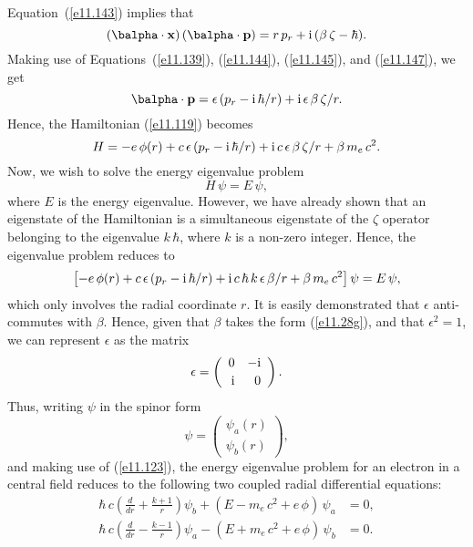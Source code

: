 Equation~(\ref{e11.143}) implies that
\begin{equation}
(\balpha\cdot{\bf x})\,(\balpha\cdot{\bf p}) = r\,p_r+{\rm i}\,(\beta\,\zeta-\hbar).
\end{equation}
Making use of Equations~(\ref{e11.139}), (\ref{e11.144}), (\ref{e11.145}), and (\ref{e11.147}), we get
\begin{equation}
\balpha\cdot {\bf p} = \epsilon\,(p_r-{\rm i}\,\hbar/r) + {\rm i}\,\epsilon\,\beta\,\zeta/r.
\end{equation}
Hence, the Hamiltonian (\ref{e11.119}) becomes
\begin{equation}
H= - e\,\phi(r) + c\,\epsilon\,(p_r-{\rm i}\,\hbar/r) + {\rm i}\,c\,\epsilon\,\beta\,\zeta/r + \beta\,m_e\,c^2.
\end{equation}
Now, we wish to solve the energy eigenvalue problem
\begin{equation}
H\,\psi = E\,\psi,
\end{equation}
where $E$ is the energy eigenvalue. However, we have already shown that  an eigenstate of the Hamiltonian is a simultaneous eigenstate of the $\zeta$
operator belonging to the eigenvalue $k\,\hbar$, where $k$ is a non-zero integer. Hence, the eigenvalue problem reduces to
\begin{equation}
\left[- e\,\phi(r) + c\,\epsilon\,(p_r-{\rm i}\,\hbar/r) + {\rm i}\,c\,\hbar\,k\,\epsilon\,\beta/r + \beta\,m_e\,c^2\right]\psi = E\,\psi,
\end{equation}
which only involves the radial coordinate $r$. It is easily demonstrated that $\epsilon$ anti-commutes with $\beta$. Hence, given that
$\beta$ takes the form (\ref{e11.28g}), and  that $\epsilon^2=1$, we can represent $\epsilon$ as the matrix
\begin{equation}
\epsilon = \left(\begin{array}{rr}0&-{\rm i}\\[0.5ex]{\rm i}&0\end{array}\right).
\end{equation}
Thus, writing $\psi$ in the spinor form 
\begin{equation}
\psi = \left(\begin{array}{c} \psi_a(r)\\[0.5ex]\psi_b(r)\end{array}\right),
\end{equation}
and making use of (\ref{e11.123}), 
the energy eigenvalue problem for an electron in a central field reduces to the following two coupled radial differential equations:
\begin{align}\label{e11.159}
\hbar\,c\left(\frac{d}{d r} + \frac{k+1}{r}\right)\psi_b + (E-m_e\,c^2+e\,\phi)\,\psi_a&= 0,\\[0.5ex]
\hbar\,c\left(\frac{d}{d r}-\frac{k-1}{r}\right)\psi_a - (E+m_e\,c^2+e\,\phi)\,\psi_b &=0.\label{e11.160}
\end{align}

